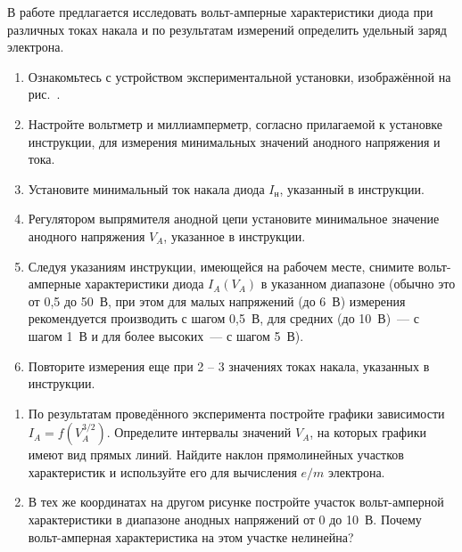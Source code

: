 \begin{lab:task}

В работе предлагается исследовать вольт-амперные характеристики диода при различных токах накала и по результатам
измерений определить удельный заряд электрона.

\begin{enumerate}

\item{Ознакомьтесь с устройством экспериментальной установки, изображённой на рис.~.}

\item{Настройте вольтметр и миллиамперметр, согласно прилагаемой к установке инструкции, для измерения минимальных значений анодного напряжения и тока.}

\item{ Установите минимальный  ток накала диода $I_\text{н}$, указанный в инструкции.}

\item{ Регулятором выпрямителя анодной цепи установите минимальное значение анодного напряжения $V_{A}$, указанное в инструкции.}

\item{ Следуя указаниям инструкции, имеющейся на рабочем месте, снимите вольт-амперные характеристики диода $I_{A}(V_{A})$ в указанном диапазоне (обычно это от 0,5 до 50~В, при этом для малых напряжений (до 6~В) измерения рекомендуется производить с шагом 0,5~В, для средних (до 10~В)~--- с шагом 1~В и для более высоких~--- с шагом 5~В).}

\item{ Повторите измерения еще при 2 -- 3 значениях токах накала, указанных в инструкции.}
\end{enumerate}


\begin{enumerate}
\item{ По результатам проведённого эксперимента постройте графики зависимости $I_A = f(V_{A}^{3/2})$. Определите интервалы значений $V_{A}$, на которых графики имеют вид прямых линий. Найдите  наклон прямолинейных участков характеристик и используйте его для вычисления $e/m$ электрона.}
\item{ В тех же координатах на другом рисунке постройте участок вольт-амперной характеристики в диапазоне анодных напряжений от 0 до 10~В. Почему вольт-амперная характеристика на этом участке нелинейна?}
\end{enumerate}

\end{lab:task}


